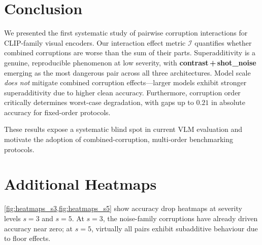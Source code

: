\documentclass[10pt, twocolumn]{article}
\newcommand{\cI}{\mathcal{I}}          %
\begin{document}
\section{Conclusion}
\label{sec:conclusion}

We presented the first systematic study of pairwise
corruption interactions for CLIP-family visual encoders.
Our interaction effect metric $\cI$ quantifies whether
combined corruptions are worse than the sum of their
parts.
Superadditivity is a genuine, reproducible phenomenon
at low severity, with \textbf{contrast\,+\,shot\_noise}
emerging as the most dangerous pair across all three
architectures.
Model scale \emph{does not} mitigate combined corruption
effects---larger models exhibit stronger superadditivity
due to higher clean accuracy.
Furthermore, corruption order critically determines
worst-case degradation, with gaps up to $0.21$ in
absolute accuracy for fixed-order protocols.

These results expose a systematic blind spot in current
VLM evaluation and motivate the adoption of
combined-corruption, multi-order benchmarking protocols.

\clearpage          %



\appendix
\section{Additional Heatmaps}
\label{app:heatmaps}

\cref{fig:heatmaps_s3,fig:heatmaps_s5} show accuracy
drop heatmaps at severity levels $s=3$ and $s=5$.
At $s=3$, the noise-family corruptions have already
driven accuracy near zero; at $s=5$, virtually all
pairs exhibit subadditive behaviour due to floor
effects.
\end{document}
